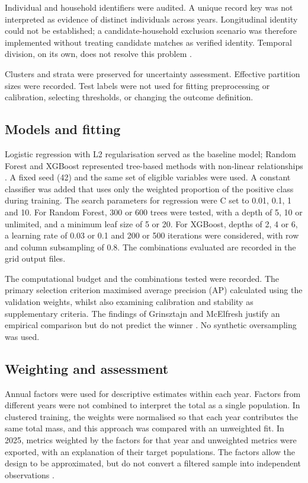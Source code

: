 Individual and household identifiers were audited. A unique record key was not interpreted as evidence of distinct individuals across years. Longitudinal identity could not be established; a candidate-household exclusion scenario was therefore implemented without treating candidate matches as verified identity. Temporal division, on its own, does not resolve this problem \cite{Kapoor2023}.

Clusters and strata were preserved for uncertainty assessment. Effective partition sizes were recorded. Test labels were not used for fitting preprocessing or calibration, selecting thresholds, or changing the outcome definition.

\subsection{Models and fitting}



Logistic regression with L2 regularisation served as the baseline model; Random Forest and XGBoost represented tree-based methods with non-linear relationships \cite{Breiman2001,Chen2016,James2023}. A fixed seed (42) and the same set of eligible variables were used. A constant classifier was added that uses only the weighted proportion of the positive class during training. The search parameters for regression were C set to 0.01, 0.1, 1 and 10. For Random Forest, 300 or 600 trees were tested, with a depth of 5, 10 or unlimited, and a minimum leaf size of 5 or 20. For XGBoost, depths of 2, 4 or 6, a learning rate of 0.03 or 0.1 and 200 or 500 iterations were considered, with row and column subsampling of 0.8. The combinations evaluated are recorded in the grid output files.

The computational budget and the combinations tested were recorded. The primary selection criterion maximised average precision (AP) calculated using the validation weights, whilst also examining calibration and stability as supplementary criteria. The findings of Grinsztajn and McElfresh justify an empirical comparison but do not predict the winner \cite{Grinsztajn2022,McElfresh2023}. No synthetic oversampling was used.

\subsection{Weighting and assessment}



Annual factors were used for descriptive estimates within each year. Factors from different years were not combined to interpret the total as a single population. In clustered training, the weights were normalised so that each year contributes the same total mass, and this approach was compared with an unweighted fit. In 2025, metrics weighted by the factors for that year and unweighted metrics were exported, with an explanation of their target populations. The factors allow the design to be approximated, but do not convert a filtered sample into independent observations \cite{Censos2025,InstitutoNacionaldeEstadsticayCensos2026}.

